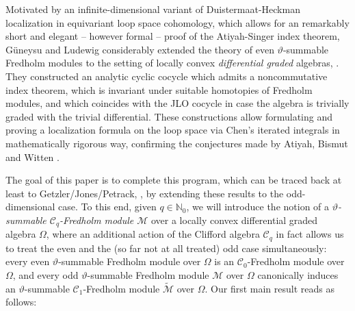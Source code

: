 \documentclass[a4paper, english, 12pt, bibliography=totocnumbered,
index=totoc]{scrartcl}
\begin{document}
Motivated by an infinite-dimensional variant of Duistermaat-Heckman
localization in equivariant loop space cohomology, which allows for an
remarkably short and elegant -- however formal --
proof of the Atiyah-Singer index theorem, Güneysu and Ludewig considerably
extended the theory of even $\vartheta$-summable Fredholm modules to the
setting of locally convex \emph{differential graded} algebras,
\cite{GüneysuLudewig}.
They constructed an analytic cyclic cocycle which admits a
noncommutative index theorem, which is invariant under suitable homotopies of
Fredholm modules, and which coincides with the JLO cocycle in case the algebra
is trivially graded with the trivial differential.
These constructions allow formulating and proving a localization formula on the
loop space via Chen's iterated integrals in mathematically rigorous way,
confirming the conjectures made by Atiyah, Bismut and Witten
\cite{AtiyahCircular,BismutCMP85}.

The goal of this paper is to complete this program, which can be traced back at
least to Getzler/Jones/Petrack, \cite{GetzlerJonesPetrack}, by extending these
results to the odd-dimensional case.
To this end, given $q\in\mathbb{N}_0$, we will introduce the notion of a
\emph{$\vartheta$-summable $\mathcal{C}_q$-Fredholm module $\mathscr{M}$} over
a locally convex differential graded algebra $\Omega$, where an additional
action of the Clifford algebra $\mathcal{C}_q$ in fact allows us to treat the
even and the (so far not at all treated) odd case
simultaneously: every even $\vartheta$-summable Fredholm module over $\Omega$
is an $\mathcal{C}_0$-Fredholm module over $\Omega$, and every odd
$\vartheta$-summable Fredholm module $\mathscr{M}$ over $\Omega$ canonically
induces an $\vartheta$-summable $\mathcal{C}_1$-Fredholm module
$\tilde{\mathscr{M}}$ over $\Omega$.
Our first main result reads as follows:
\end{document}
